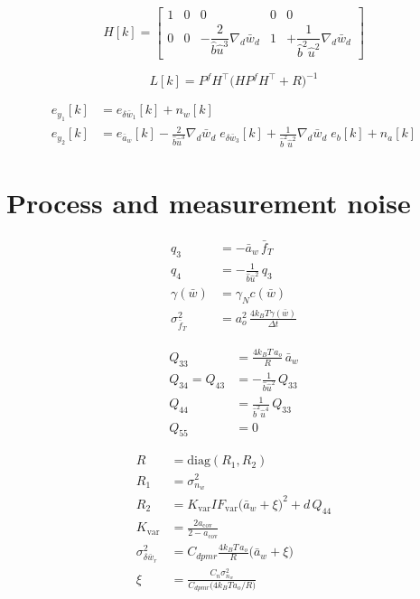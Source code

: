 \documentclass[11pt,a4paper,fontset=none]{ctexart}
\newcommand{\ba}{\bar{a}}
\newcommand{\bw}{\bar{w}}
\begin{document}
\begin{equation*}
H[k] =
\begin{bmatrix}
1 & 0 & 0 & 0 & 0 \\[0.6em]
0 & 0 & -\dfrac{2}{\hat{b}\hat{u}^{3}}\nabla_d\bw_d & 1
  & +\dfrac{1}{\hat{b}^{2}\hat{u}^{2}}\nabla_d\bw_d
\end{bmatrix}
\end{equation*}

\begin{equation*}
L[k] = P^f H^{\top}\bigl(HP^fH^{\top}+R\bigr)^{-1}
\end{equation*}

\begin{align*}
e_{y_1}[k] &= e_{\delta\bw_1}[k] + n_w[k] \\
e_{y_2}[k] &= e_{\ba_w}[k]
  - \frac{2}{\hat{b}\hat{u}^{3}}\nabla_d\bw_d\;e_{\delta\bw_3}[k]
  + \frac{1}{\hat{b}^{2}\hat{u}^{2}}\nabla_d\bw_d\;e_b[k]
  + n_a[k]
\end{align*}

\section{Process and measurement noise}

\begin{align*}
q_3 &= -\ba_w\,\bar{f}_T \\
q_4 &= -\frac{1}{\hat{b}\hat{u}^{2}}\,q_3 \\
\gamma(\bw) &= \gamma_N c(\bw) \\
\sigma^{2}_{\bar{f}_T} &= a_o^{2}\,\frac{4k_BT\gamma(\bw)}{\Delta t}
\end{align*}

\begin{align*}
Q_{33} &= \frac{4k_BT\,a_o}{R}\,\ba_w \\
Q_{34} = Q_{43} &= -\frac{1}{\hat{b}\hat{u}^{2}}\,Q_{33} \\
Q_{44} &= \frac{1}{\hat{b}^{2}\hat{u}^{4}}\,Q_{33} \\
Q_{55} &= 0
\end{align*}

\begin{align*}
R &= \mathrm{diag}(R_1, R_2) \\
R_1 &= \sigma^{2}_{n_w} \\
R_2 &= K_{\mathrm{var}} IF_{\mathrm{var}}\bigl(\ba_w+\xi\bigr)^{2} + d\,Q_{44} \\
K_{\mathrm{var}} &= \frac{2a_{\mathrm{cov}}}{2-a_{\mathrm{cov}}} \\
\sigma^{2}_{\delta\bw_r} &= C_{dpmr}\frac{4k_BT\,a_o}{R}\bigl(\ba_w+\xi\bigr) \\
\xi &= \frac{C_n\sigma^{2}_{n_w}}{C_{dpmr}\bigl(4k_BT a_o/R\bigr)}
\end{align*}
\end{document}
